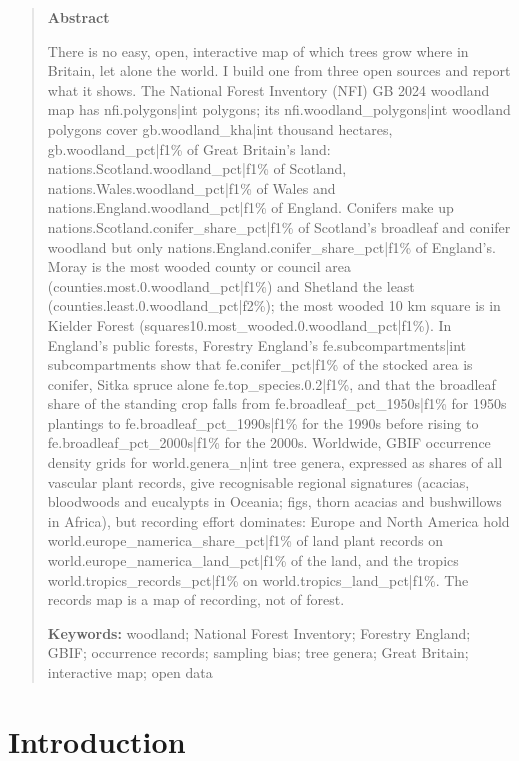 \documentclass[11pt,a4paper]{article}
\begin{document}
\begin{quote}
\small
\begin{center}\textbf{Abstract}\end{center}
There is no easy, open, interactive map of which trees grow where in Britain, let alone the world. I build one from three open sources and report what it shows. The National Forest Inventory (NFI) GB 2024 woodland map has {{nfi.polygons|int}} polygons; its {{nfi.woodland_polygons|int}} woodland polygons cover {{gb.woodland_kha|int}} thousand hectares, {{gb.woodland_pct|f1}}\% of Great Britain's land: {{nations.Scotland.woodland_pct|f1}}\% of Scotland, {{nations.Wales.woodland_pct|f1}}\% of Wales and {{nations.England.woodland_pct|f1}}\% of England. Conifers make up {{nations.Scotland.conifer_share_pct|f1}}\% of Scotland's broadleaf and conifer woodland but only {{nations.England.conifer_share_pct|f1}}\% of England's. Moray is the most wooded county or council area ({{counties.most.0.woodland_pct|f1}}\%) and Shetland the least ({{counties.least.0.woodland_pct|f2}}\%); the most wooded 10 km square is in Kielder Forest ({{squares10.most_wooded.0.woodland_pct|f1}}\%). In England's public forests, Forestry England's {{fe.subcompartments|int}} subcompartments show that {{fe.conifer_pct|f1}}\% of the stocked area is conifer, Sitka spruce alone {{fe.top_species.0.2|f1}}\%, and that the broadleaf share of the standing crop falls from {{fe.broadleaf_pct_1950s|f1}}\% for 1950s plantings to {{fe.broadleaf_pct_1990s|f1}}\% for the 1990s before rising to {{fe.broadleaf_pct_2000s|f1}}\% for the 2000s. Worldwide, GBIF occurrence density grids for {{world.genera_n|int}} tree genera, expressed as shares of all vascular plant records, give recognisable regional signatures (acacias, bloodwoods and eucalypts in Oceania; figs, thorn acacias and bushwillows in Africa), but recording effort dominates: Europe and North America hold {{world.europe_namerica_share_pct|f1}}\% of land plant records on {{world.europe_namerica_land_pct|f1}}\% of the land, and the tropics {{world.tropics_records_pct|f1}}\% on {{world.tropics_land_pct|f1}}\%. The records map is a map of recording, not of forest.

\textbf{Keywords:} woodland; National Forest Inventory; Forestry England; GBIF; occurrence records; sampling bias; tree genera; Great Britain; interactive map; open data
\end{quote}

\section{Introduction}
\end{document}
